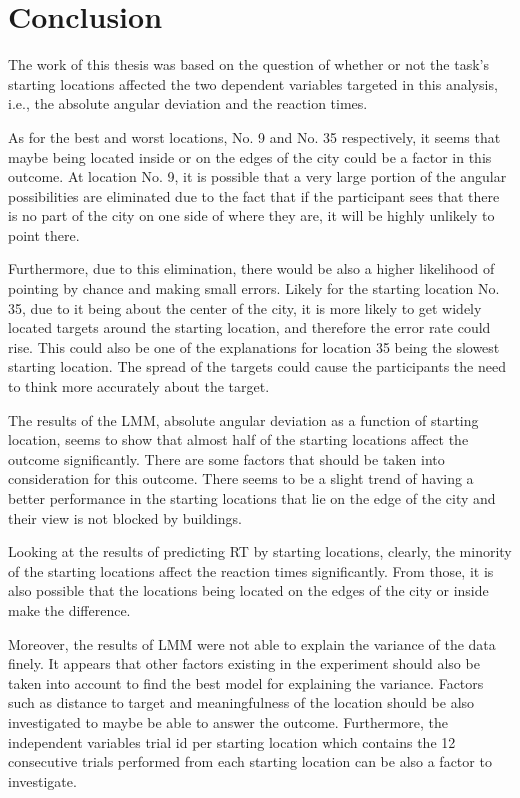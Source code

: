 \chapter{Conclusion}

The work of this thesis was based on the question of whether or not the task's starting locations affected the two dependent variables targeted in this analysis, i.e., the absolute angular deviation and the reaction times.

As for the best and worst locations, No. 9 and No. 35 respectively, it seems that maybe being located inside or on the edges of the city could be a factor in this outcome. At location No. 9, it is possible that a very large portion of the angular possibilities are eliminated due to the fact that if the participant sees that there is no part of the city on one side of where they are, it will be highly unlikely to point there.

Furthermore, due to this elimination, there would be also a higher likelihood of pointing by chance and making small errors. Likely for the starting location No. 35, due to it being about the center of the city, it is more likely to get widely located targets around the starting location, and therefore the error rate could rise. This could also be one of the explanations for location 35 being the slowest starting location. The spread of the targets could cause the participants the need to think more accurately about the target. 

The results of the LMM, absolute angular deviation as a function of starting location, seems to show that almost half of the starting locations affect the outcome significantly. There are some factors that should be taken into consideration for this outcome. There seems to be a slight trend of having a better performance in the starting locations that lie on the edge of the city and their view is not blocked by buildings.

Looking at the results of predicting RT by starting locations, clearly, the minority of the starting locations affect the reaction times significantly. From those, it is also possible that the locations being located on the edges of the city or inside make the difference. 

Moreover, the results of LMM were not able to explain the variance of the data finely. It appears that other factors existing in the experiment should also be taken into account to find the best model for explaining the variance. Factors such as distance to target and meaningfulness of the location should be also investigated to maybe be able to answer the outcome. Furthermore, the independent variables trial id per starting location which contains the 12 consecutive trials performed from each starting location can be also a factor to investigate.

